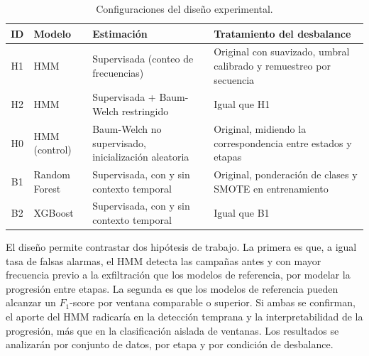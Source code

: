 \begin{table}[h!]
\centering
\small
\renewcommand{\arraystretch}{1.25}
\begin{tabularx}{\textwidth}{|c|p{3.4cm}|X|X|}
\hline
\textbf{ID} & \textbf{Modelo} & \textbf{Estimación} & \textbf{Tratamiento del desbalance} \\ \hline
H1 & HMM & Supervisada (conteo de frecuencias) & Original con suavizado, umbral calibrado y remuestreo por secuencia \\ \hline
H2 & HMM & Supervisada + Baum-Welch restringido & Igual que H1 \\ \hline
H0 & HMM (control) & Baum-Welch no supervisado, inicialización aleatoria & Original, midiendo la correspondencia entre estados y etapas \\ \hline
B1 & Random Forest & Supervisada, con y sin contexto temporal & Original, ponderación de clases y SMOTE en entrenamiento \\ \hline
B2 & XGBoost & Supervisada, con y sin contexto temporal & Igual que B1 \\ \hline
\end{tabularx}
\caption{Configuraciones del diseño experimental.}
\label{tab:experimentos}
\end{table}
\FloatBarrier

El diseño permite contrastar dos hipótesis de trabajo. La primera es que, a igual tasa de falsas alarmas, el HMM detecta las campañas antes y con mayor frecuencia previo a la exfiltración que los modelos de referencia, por modelar la progresión entre etapas. La segunda es que los modelos de referencia pueden alcanzar un $F_1$-score por ventana comparable o superior. Si ambas se confirman, el aporte del HMM radicaría en la detección temprana y la interpretabilidad de la progresión, más que en la clasificación aislada de ventanas. Los resultados se analizarán por conjunto de datos, por etapa y por condición de desbalance.
